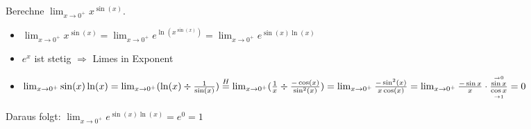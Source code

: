 \begin{example}
	Berechne $\lim_{x \to 0^+} x^{\sin(x)}$.
 \begin{itemize}
     \item $\lim_{x \to 0^+} x^{\sin(x)} = \lim_{x \to 0^+} e^{ \ln \left( x^{\sin(x)} \right)} = \lim_{x \to 0^+} e^{\sin (x) \ln (x)}$
     \item $e^x$ ist stetig $\Rightarrow$ Limes in Exponent
     \item $\lim_{x \to 0^+} \sin(x) \ln(x) = \lim_{x \to 0^+} (\ln(x) \div \frac{1}{\sin(x)})
		\overset{H}{=} \lim_{x \to 0^+} (\frac{1}{x}\div \frac{-\cos (x)}{\sin^2 (x)})\\ = \lim_{x \to
		0^+} \frac{- \sin^2 (x)}{x \cos (x)}
						= \lim_{x \to 0^+} \frac{- \sin x}{x} \cdot \frac{\overset{\to 0}{\sin
						x}}{\underset{\to 1}{\cos x}} = 0$
 \end{itemize}
	Daraus folgt: $\lim_{x \to 0^+} e^{\sin (x) \ln (x)} = e^0 = 1$
\end{example}